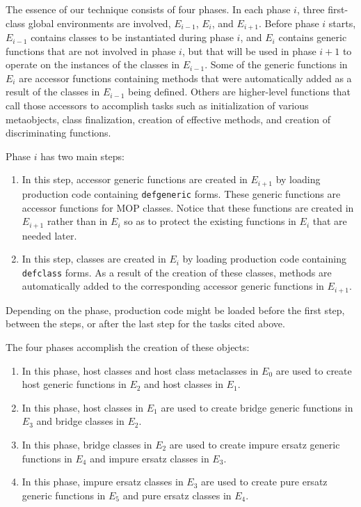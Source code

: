The essence of our technique consists of four phases.  In each phase
$i$, three first-class global environments are involved, $E_{i-1}$,
$E_{i}$, and $E_{i+1}$.  Before phase $i$ starts, $E_{i-1}$ contains
classes to be instantiated during phase $i$, and $E_i$ contains
generic functions that are not involved in phase $i$, but that will be
used in phase $i+1$ to operate on the instances of the classes in
$E_{i-1}$.  Some of the generic functions in $E_i$ are accessor
functions containing methods that were automatically added as a result
of the classes in $E_{i-1}$ being defined.  Others are higher-level
functions that call those accessors to accomplish tasks such as
initialization of various metaobjects, class finalization, creation of
effective methods, and creation of discriminating functions.

Phase $i$ has two main steps:

\begin{enumerate}
\item In this step, accessor generic functions are created in
  $E_{i+1}$ by loading \sicl{} production code containing
  \texttt{defgeneric} forms.  These generic functions are accessor
  functions for MOP classes.  Notice that these functions are created
  in $E_{i+1}$ rather than in $E_i$ so as to protect the existing
  functions in $E_i$ that are needed later.
\item In this step, classes are created in $E_i$ by loading \sicl{}
  production code containing \texttt{defclass} forms.  As a result of
  the creation of these classes, methods are automatically added to
  the corresponding accessor generic functions in $E_{i+1}$.
\end{enumerate}

Depending on the phase, \sicl{} production code might be loaded before
the first step, between the steps, or after the last step for the
tasks cited above.

The four phases accomplish the creation of these objects:

\begin{enumerate}
\item In this phase, host classes and host class metaclasses in $E_0$
  are used to create host generic functions in $E_2$ and host classes
  in $E_1$.
\item In this phase, host classes in $E_1$ are used to create bridge
  generic functions in $E_3$ and bridge classes in $E_2$.
\item In this phase, bridge classes in $E_2$ are used to create impure
  ersatz generic functions in $E_4$ and impure ersatz classes in
  $E_3$.
\item In this phase, impure ersatz classes in $E_3$ are used to create
  pure ersatz generic functions in $E_5$ and pure ersatz classes in
  $E_4$.
\end{enumerate}

